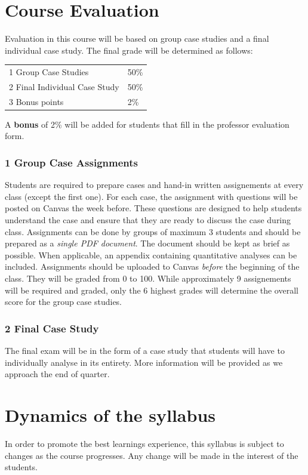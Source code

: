 \documentclass{article}
\begin{document}
\section*{Course Evaluation}

Evaluation in this course will be based on group case studies and a final individual case study.
The final grade will be determined as follows:

\vspace{.2in}
\begin{tabular}{p{2in}l}
1 Group Case Studies			&	50\% \\
2 Final Individual Case Study		&	50\% \\
3 Bonus points				&	2\%
\end{tabular}
\vspace{.2in}

A {\bf bonus} of 2\% will be added for students that fill in the professor evaluation form.

\subsubsection*{1 Group Case Assignments}
Students are required to prepare cases and hand-in written assignements at
every class (except the first one).
For each case, the assignment with questions will be posted on Canvas the week before.
These questions are designed to help students understand the case and ensure that
they are ready to discuss the case during class.
Assignments can be done by groups of maximum 3 students and should be
prepared as a \emph{single PDF document}. The document should be kept as brief
as possible. When applicable, an appendix containing quantitative analyses can be included.
Assignments should be uploaded to Canvas \emph{before} the beginning of the
class. They will be graded from 0 to 100. While approximately 9 assignements
will be required and graded, only the 6 highest grades will determine
the overall score for the group case studies.

\subsubsection*{2 Final Case Study}
The final exam will be in the form of a case study that students will have to
individually analyse in its entirety.
More information will be provided as we approach the end of quarter.

\section*{Dynamics of the syllabus}
In order to promote the best learnings experience, this syllabus is subject to
changes as the course progresses. Any change will be made in the interest of
the students.
\end{document}

